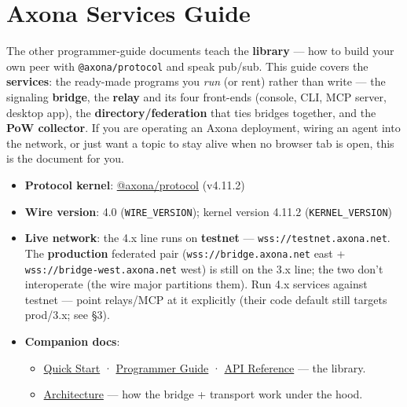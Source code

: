 \documentclass[
  nobib]{tufte-handout}
\author{}
\date{}
\providecommand{\tightlist}{%
  \setlength{\itemsep}{0pt}\setlength{\parskip}{0pt}}
\begin{document}
\section{Axona Services Guide}\label{axona-services-guide}

The other programmer-guide documents teach the \textbf{library} --- how
to build your own peer with \texttt{@axona/protocol} and speak pub/sub.
This guide covers the \textbf{services}: the ready-made programs you
\emph{run} (or rent) rather than write --- the signaling
\textbf{bridge}, the \textbf{relay} and its four front-ends (console,
CLI, MCP server, desktop app), the \textbf{directory/federation} that
ties bridges together, and the \textbf{PoW collector}. If you are
operating an Axona deployment, wiring an agent into the network, or just
want a topic to stay alive when no browser tab is open, this is the
document for you.

\begin{itemize}
\tightlist
\item
  \textbf{Protocol kernel}:
  \href{https://github.com/axona-net/axona-protocol}{@axona/protocol}
  (v4.11.2)
\item
  \textbf{Wire version}: 4.0 (\texttt{WIRE\_VERSION}); kernel version
  4.11.2 (\texttt{KERNEL\_VERSION})
\item
  \textbf{Live network}: the 4.x line runs on \textbf{testnet} ---
  \texttt{wss://testnet.axona.net}. The \textbf{production} federated
  pair (\texttt{wss://bridge.axona.net} east +
  \texttt{wss://bridge-west.axona.net} west) is still on the 3.x line;
  the two don't interoperate (the wire major partitions them). Run 4.x
  services against testnet --- point relays/MCP at it explicitly (their
  code default still targets prod/3.x; see §3).
\item
  \textbf{Companion docs}:

  \begin{itemize}
  \tightlist
  \item
    \href{Quick-Start-v4.11.2.md}{Quick Start} ·
    \href{Axona-Programmer-Guide-v4.11.2.md}{Programmer Guide} ·
    \href{Axona-API-Reference-v4.11.2.md}{API Reference} --- the
    library.
  \item
    \href{../architecture/Axona-Architecture.tex}{Architecture} --- how
    the bridge + transport work under the hood.
  \end{itemize}
\end{itemize}
\end{document}
